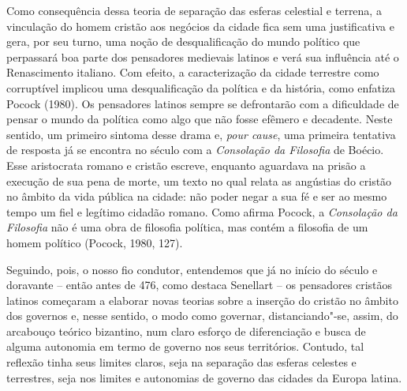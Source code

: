 Como consequência dessa teoria de separação das esferas celestial e
terrena, a vinculação do homem cristão aos negócios da cidade fica sem
uma justificativa e gera, por seu turno, uma noção de desqualificação do
mundo político que perpassará boa parte dos pensadores medievais latinos
e verá sua influência até o Renascimento italiano. Com efeito, a
caracterização da cidade terrestre como corruptível implicou uma
desqualificação da política e da história, como enfatiza Pocock (1980).
Os pensadores latinos sempre se defrontarão com a dificuldade de pensar
o mundo da política como algo que não fosse efêmero e decadente. Neste
sentido, um primeiro sintoma desse drama e, \emph{pour cause}, uma
primeira tentativa de resposta já se encontra no século  com a
\emph{Consolação da Filosofia} de Boécio. Esse aristocrata romano e
cristão escreve, enquanto aguardava na prisão a execução de sua pena de
morte, um texto no qual relata as angústias do cristão no âmbito da vida
pública na cidade: não poder negar a sua fé e ser ao mesmo tempo um fiel
e legítimo cidadão romano. Como afirma Pocock, a \emph{Consolação da
Filosofia} não é uma obra de filosofia política, mas contém a filosofia
de um homem político (Pocock, 1980, 127).

Seguindo, pois, o nosso fio condutor, entendemos que já no início do
século  e doravante -- então antes de 476, como destaca Senellart -- os
pensadores cristãos latinos começaram a elaborar novas teorias sobre a
inserção do cristão no âmbito dos governos e, nesse sentido, o modo como
governar, distanciando"-se, assim, do arcabouço teórico bizantino, num
claro esforço de diferenciação e busca de alguma autonomia em termo de
governo nos seus territórios. Contudo, tal reflexão tinha seus limites
claros, seja na separação das esferas celestes e terrestres, seja nos
limites e autonomias de governo das cidades da Europa latina.

